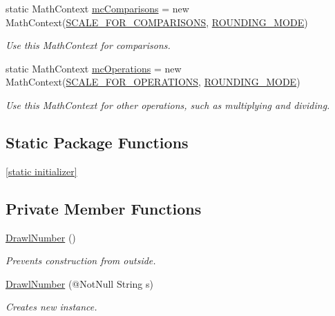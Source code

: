 \begin{DoxyCompactItemize}
static Math\+Context \hyperlink{classcom_1_1aarrelaakso_1_1drawl_1_1_drawl_number_a520b230ee4ceb0e1bef368ace676a954}{mc\+Comparisons} = new Math\+Context(\hyperlink{classcom_1_1aarrelaakso_1_1drawl_1_1_drawl_number_ace1cb62d1ecce8212578d1a13cf5cbc4}{S\+C\+A\+L\+E\+\_\+\+F\+O\+R\+\_\+\+C\+O\+M\+P\+A\+R\+I\+S\+O\+NS}, \hyperlink{classcom_1_1aarrelaakso_1_1drawl_1_1_drawl_number_ab4b44bb0675da90d8f435286911b711e}{R\+O\+U\+N\+D\+I\+N\+G\+\_\+\+M\+O\+DE})
\begin{DoxyCompactList}\small\item\em Use this Math\+Context for comparisons. \end{DoxyCompactList}\item 
static Math\+Context \hyperlink{classcom_1_1aarrelaakso_1_1drawl_1_1_drawl_number_a75a2442ef7cdcfb4dca9aba870ee7108}{mc\+Operations} = new Math\+Context(\hyperlink{classcom_1_1aarrelaakso_1_1drawl_1_1_drawl_number_ab9bb5bf4986830f56f01cb218ba637ce}{S\+C\+A\+L\+E\+\_\+\+F\+O\+R\+\_\+\+O\+P\+E\+R\+A\+T\+I\+O\+NS}, \hyperlink{classcom_1_1aarrelaakso_1_1drawl_1_1_drawl_number_ab4b44bb0675da90d8f435286911b711e}{R\+O\+U\+N\+D\+I\+N\+G\+\_\+\+M\+O\+DE})
\begin{DoxyCompactList}\small\item\em Use this Math\+Context for other operations, such as multiplying and dividing. \end{DoxyCompactList}\end{DoxyCompactItemize}
\subsection*{Static Package Functions}
\begin{DoxyCompactItemize}
\item 
\hyperlink{classcom_1_1aarrelaakso_1_1drawl_1_1_drawl_number_aad8d7aeb9f6e8f549e93b830b5ef5f8d}{\mbox{[}static initializer\mbox{]}}
\end{DoxyCompactItemize}
\subsection*{Private Member Functions}
\begin{DoxyCompactItemize}
\item 
\hyperlink{classcom_1_1aarrelaakso_1_1drawl_1_1_drawl_number_ae870bc04b03801d06c155d5f89e1319e}{Drawl\+Number} ()
\begin{DoxyCompactList}\small\item\em Prevents construction from outside. \end{DoxyCompactList}\item 
\hyperlink{classcom_1_1aarrelaakso_1_1drawl_1_1_drawl_number_a52142e9c6a7e3dcefa2231633e2c5549}{Drawl\+Number} (@Not\+Null String s)
\begin{DoxyCompactList}\small\item\em Creates new instance. \end{DoxyCompactList}\end{DoxyCompactItemize}
